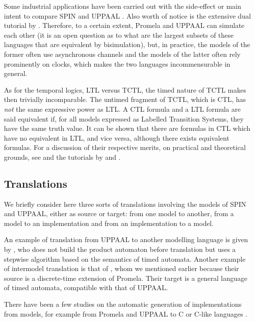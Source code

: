 \documentclass[a4paper,11pt,twoside]{article}
\newcommand\SPIN{\textsf{SPIN}\xspace}
\newcommand\Promela{\textsf{Promela}\xspace}
\newcommand\UPPAAL{\textsf{UPPAAL}\xspace}
\newcommand\Clang{\textsf{C}\xspace}
\begin{document}
Some industrial applications have been carried out with the
side\hyp{}effect or main intent to compare \SPIN and \UPPAAL
\citep{JensenLarsenSkou:1996,Lingegowda:2006,NabialekJanowskaJanowski:2008,GuentherMiliusMoeller:2012,AlzahraniGeorgieva:2013}. Also
worth of notice is the extensive dual tutorial by
\citet{Kluppelholz:2012}. Therefore, to a certain extent, \Promela and
\UPPAAL can simulate each other (it is an open question as to what are
the largest subsets of these languages that are equivalent by
bisimulation), but, in practice, the models of the former often use
asynchronous channels and the models of the latter often rely
prominently on clocks, which makes the two languages incommensurable
in general.

As for the temporal logics, LTL versus TCTL, the timed nature of TCTL
makes then trivially incomparable. The untimed fragment of TCTL, which
is CTL, has \emph{not} the same expressive power as LTL. A CTL formula
and a LTL formula are said equivalent if, for all models expressed as
Labelled Transition Systems, they have the same truth value. It can be
shown that there are formulas in CTL which have no equivalent in LTL,
and vice versa, although there exists equivalent formulas. For a
discussion of their respective merits, on practical and theoretical
grounds, see \citet{Vardi:2001} and the tutorials by
\citet{Katoen:2007} and \citet{Bellarmine_Krug:2010}.

\subsection{Translations}

We briefly consider here three sorts of translations involving the
models of \SPIN and \UPPAAL, either as source or target: from one
model to another, from a model to an implementation and from an
implementation to a model.

An example of translation from \UPPAAL to another modelling language
is given by \citet{Abel:2009}, who does not build the product
automaton before translation but uses a stepwise algorithm based on
the semantics of timed automata. Another example of intermodel
translation is that of \citet{NabialekJanowskaJanowski:2008}, whom we
mentioned earlier because their source is a discrete\hyp{}time
extension of \Promela. Their target is a general language of timed
automata, compatible with that of \UPPAAL.

There have been a few studies on the automatic generation of
implementations from models, for example from \Promela and \UPPAAL to
\Clang or \Clang-like languages
\citep{KristensenMejlholmPedersen:XXXX,Loefller:1996,Hendriks:2001}.
\end{document}
